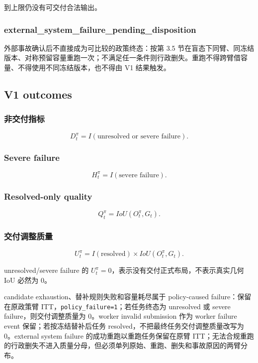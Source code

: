 到上限仍没有可交付合法输出。

\subsubsection{external\_system\_failure\_pending\_disposition}

外部事故确认后不直接成为可比较的政策终态：按第 3.5 节在盲态下同臂、同冻结版本、对称预留容量重跑一次；不满足任一条件则行政删失。重跑不得跨臂借容量、不得使用不同冻结版本，也不得由 V1 结果触发。

\subsection{V1 outcomes}

\subsubsection{非交付指标}

\[
D_t^\pi
=
I(\text{unresolved or severe failure}).
\]

\subsubsection{Severe failure}

\[
H_t^\pi
=
I(\text{severe failure}).
\]

\subsubsection{Resolved-only quality}

\[
Q_t^\pi=IoU(O_t^\pi,G_t).
\]

\subsubsection{交付调整质量}

\[
U_t^\pi
=
I(\text{resolved})\times IoU(O_t^\pi,G_t).
\]

unresolved/severe failure 的 \(U_t^\pi=0\)，表示没有交付正式布局，不表示真实几何 IoU 必然为 0。

candidate exhaustion、替补规则失败和容量耗尽属于 policy-caused failure：保留在原政策臂 ITT，\texttt{policy\_failure=1}；若任务终态为 unresolved 或 severe failure，则交付调整质量为 0。worker invalid submission 作为 worker failure event 保留；若按冻结替补后任务 resolved，不把最终任务交付调整质量改写为 0。external system failure 的成功重跑以重跑任务保留在原臂 ITT；无法合规重跑的行政删失不进入质量分母，但必须单列原始、重跑、删失和事故原因的两臂分布。

